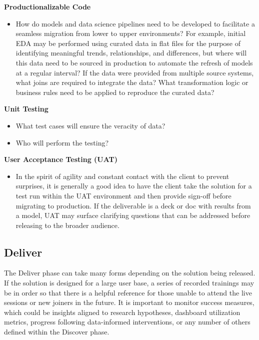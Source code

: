 \documentclass[
]{book}
\providecommand{\tightlist}{%
  \setlength{\itemsep}{0pt}\setlength{\parskip}{0pt}}
\begin{document}
\textbf{Productionalizable Code}

\begin{itemize}
\tightlist
\item
  How do models and data science pipelines need to be developed to facilitate a seamless migration from lower to upper environments? For example, initial EDA may be performed using curated data in flat files for the purpose of identifying meaningful trends, relationships, and differences, but where will this data need to be sourced in production to automate the refresh of models at a regular interval? If the data were provided from multiple source systems, what joins are required to integrate the data? What transformation logic or business rules need to be applied to reproduce the curated data?
\end{itemize}

\textbf{Unit Testing}

\begin{itemize}
\tightlist
\item
  What test cases will ensure the veracity of data?
\item
  Who will perform the testing?
\end{itemize}

\textbf{User Acceptance Testing (UAT)}

\begin{itemize}
\tightlist
\item
  In the spirit of agility and constant contact with the client to prevent surprises, it is generally a good idea to have the client take the solution for a test run within the UAT environment and then provide sign-off before migrating to production. If the deliverable is a deck or doc with results from a model, UAT may surface clarifying questions that can be addressed before releasing to the broader audience.
\end{itemize}

\hypertarget{deliver}{%
\subsection{Deliver}\label{deliver}}

The Deliver phase can take many forms depending on the solution being released. If the solution is designed for a large user base, a series of recorded trainings may be in order so that there is a helpful reference for those unable to attend the live sessions or new joiners in the future. It is important to monitor success measures, which could be insights aligned to research hypotheses, dashboard utilization metrics, progress following data-informed interventions, or any number of others defined within the Discover phase.
\end{document}

